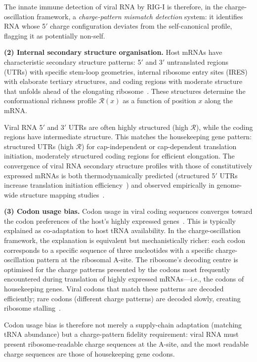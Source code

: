 \documentclass[11pt,twocolumn,a4paper]{article}
\theoremstyle{definition}
\theoremstyle{remark}
\newcommand{\Rcat}{\mathcal{R}}
\begin{document}
The innate immune detection of viral RNA by RIG-I is therefore, in the charge-oscillation framework, a \emph{charge-pattern mismatch detection} system: it identifies RNA whose 5$'$ charge configuration deviates from the self-canonical profile, flagging it as potentially non-self.

\textbf{(2) Internal secondary structure organisation.}
Host mRNAs have characteristic secondary structure patterns: 5$'$ and 3$'$ untranslated regions (UTRs) with specific stem-loop geometries, internal ribosome entry sites (IRES) with elaborate tertiary structures, and coding regions with moderate structure that unfolds ahead of the elongating ribosome~\cite{Spitale2015,Incarnato2016}. These structures determine the conformational richness profile $\Rcat(x)$ as a function of position $x$ along the mRNA.

Viral RNA 5$'$ and 3$'$ UTRs are often highly structured (high $\Rcat$), while the coding regions have intermediate structure. This matches the housekeeping gene pattern: structured UTRs (high $\Rcat$) for cap-independent or cap-dependent translation initiation, moderately structured coding regions for efficient elongation. The convergence of viral RNA secondary structure profiles with those of constitutively expressed mRNAs is both thermodynamically predicted (structured 5$'$ UTRs increase translation initiation efficiency~\cite{Kozak1989}) and observed empirically in genome-wide structure mapping studies~\cite{Watts2009,Huber2019}.

\textbf{(3) Codon usage bias.}
Codon usage in viral coding sequences converges toward the codon preferences of the host's highly expressed genes~\cite{Nakamura2000,Karlin2001}. This is typically explained as co-adaptation to host tRNA availability. In the charge-oscillation framework, the explanation is equivalent but mechanistically richer: each codon corresponds to a specific sequence of three nucleotides with a specific charge-oscillation pattern at the ribosomal A-site. The ribosome's decoding centre is optimised for the charge patterns presented by the codons most frequently encountered during translation of highly expressed mRNAs---i.e., the codons of housekeeping genes. Viral codons that match these patterns are decoded efficiently; rare codons (different charge patterns) are decoded slowly, creating ribosome stalling~\cite{Presnyak2015}.

Codon usage bias is therefore not merely a supply-chain adaptation (matching tRNA abundance) but a charge-pattern fidelity requirement: viral RNA must present ribosome-readable charge sequences at the A-site, and the most readable charge sequences are those of housekeeping gene codons.
\end{document}
